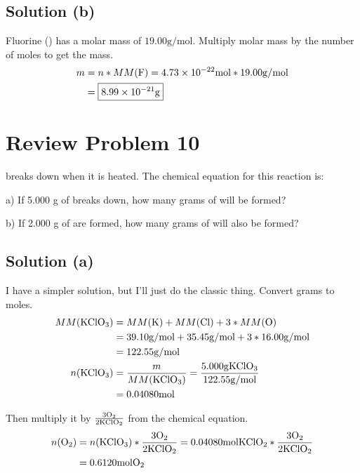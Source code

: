\documentclass[10pt]{article}
\begin{document}
        \subsection{Solution (b)}
            Fluorine () has a molar mass of $19.00 \unit{\gram/\mol}$.
            Multiply molar mass by the number of moles to get the mass.
            \begin{align}
                m   &=  n * MM(\ce{F})
                    =   4.73 \times 10^{-22} \unit{\mol} * 19.00 \unit{\gram/\mol}\\
                    &=  \boxed{8.99 \times 10^{-21} \unit{\gram}}
            \end{align}

    \pagebreak
    \section{Review Problem 10}
         breaks down when it is heated. The chemical equation for this reaction is:
        \begin{center}
        \end{center}
        a) If 5.000 g of  breaks down, how many grams of  will be formed?
        
        \noindent
        b) If 2.000 g of  are formed, how many grams of  will also be formed?

        \subsection{Solution (a)}
            I have a simpler solution, but I'll just do the classic thing.
            Convert grams to moles.
            \begin{align}
                MM(\ce{KClO3})  &=  MM(\ce{K}) + MM(\ce{Cl}) + 3 * MM(\ce{O})\\
                    &=  39.10 \unit{\gram/\mole} + 35.45 \unit{\gram/\mole} + 3 * 16.00 \unit{\gram/\mole}\\
                    &=  122.55 \unit{\gram/\mole}\\
                n(\ce{KClO3})   &=  \frac{m}{MM(\ce{KClO3})}
                    =   \frac{5.000 \unit{\gram} \ce{KClO3}}{122.55 \unit{\gram/\mole}}\\
                    &=  0.04080 \unit{\mole}
            \end{align}

            Then multiply it by $\frac{3 \ce{O2}}{2 \ce{KClO2}}$ from the chemical equation.
            \begin{align}
                n(\ce{O2})  &=  n(\ce{KClO3}) * \frac{3 \ce{O2}}{2 \ce{KClO2}}
                    =   0.04080 \unit{\mole} \ce{KClO2} * \frac{3 \ce{O2}}{2 \ce{KClO2}}\\
                    &=  0.6120 \unit{\mole} \ce{O2}
            \end{align}
\end{document}
